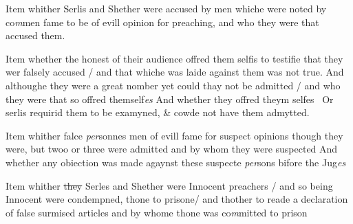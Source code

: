 \documentclass[12pt, a4paper]{book}
\begin{document}
				\marginpar[\vspace{0.5cm}{\textcolor{Gray}{6}}]{}
			
		\ifthenelse{\isodd{\thepage}}
		{\reversemarginpar}
		{\normalmarginpar}
		Item whither Serlis and Shether were accused by men whiche
were noted by co\textit{m}men fame to be of evill opinion for preaching, and 
who they were that accused them.
            		
				\marginpar[\vspace{0.5cm}{\textcolor{Gray}{7}}]{}
			
		\ifthenelse{\isodd{\thepage}}
		{\reversemarginpar}
		{\normalmarginpar}
		Item whether the honest of their audience offred them selfis to testifie
that they wer falsely accused / and that whiche was laide against
them was not true. And althoughe they were a great nomber
yet could thay
			 not be admitted / and who they were that so offred themself\textit{es}
	And whether they offred theym selfes 
			 Or serlis requirid them to be examyned, \& cowde not have them admytted.
			
            		
				\marginpar[\vspace{0.5cm}{\textcolor{Gray}{8}}]{}
			
		\ifthenelse{\isodd{\thepage}}
		{\reversemarginpar}
		{\normalmarginpar}
		Item whither falce \textit{per}sonnes men of evill fame for suspect opinions 
though they were, but twoo or three were admitted and by whom they were suspected
			 And whether
any obiection was made agaynst these suspecte \textit{per}sons bifore the Jug\textit{es}
            		
				\marginpar[\vspace{0.5cm}{\textcolor{Gray}{9}}]{}
			
		\ifthenelse{\isodd{\thepage}}
		{\reversemarginpar}
		{\normalmarginpar}
		Item whither \sout{they
               }
               Serles and Shether
			 were Innocent preachers / and so being Innocent
were condempned, thone to prisone/ and thother to reade a declaration
of false surmised articles and by whome thone was co\textit{m}mitted to prison
            		
\end{document}
